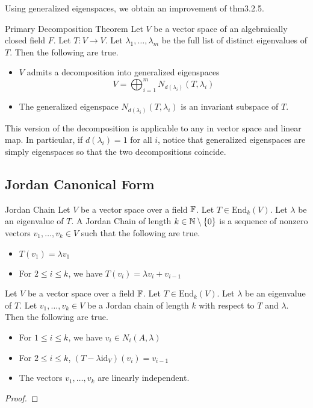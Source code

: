\documentclass[a4paper]{article}
\begin{document}
Using generalized eigenspaces, we obtain an improvement of thm3.2.5. 

\begin{thm}{Primary Decomposition Theorem}{} Let $V$ be a vector space of an algebraically closed field $F$. Let $T:V\to V$. Let $\lambda_1,\dots,\lambda_m$ be the full list of distinct eigenvalues of $T$. Then the following are true. 
\begin{itemize}
\item $V$ admits a decomposition into generalized eigenspaces $$V=\bigoplus_{i=1}^mN_{d(\lambda_i)}(T,\lambda_i)$$
\item The generalized eigenspace $N_{d(\lambda_i)}(T,\lambda_i)$ is an invariant subspace of $T$. 
\end{itemize}
\end{thm}

This version of the decomposition is applicable to any in vector space and linear map. In particular, if $d(\lambda_i)=1$ for all $i$, notice that generalized eigenspaces are simply eigenspaces so that the two decompositions coincide. 

\subsection{Jordan Canonical Form}
\begin{defn}{Jordan Chain}{} Let $V$ be a vector space over a field $\mathbb{F}$. Let $T\in\text{End}_k(V)$. Let $\lambda$ be an eigenvalue of $T$. A Jordan Chain of length $k\in\mathbb{N}\setminus\{0\}$ is a sequence of nonzero vectors $v_1,\dots,v_k\in V$ such that the following are true. 
\begin{itemize}
\item $T(v_1)=\lambda v_1$
\item For $2\leq i\leq k$, we have $T(v_i)=\lambda v_i+v_{i-1}$
\end{itemize}
\end{defn}

\begin{lmm}{}{} Let $V$ be a vector space over a field $\mathbb{F}$. Let $T\in\text{End}_k(V)$. Let $\lambda$ be an eigenvalue of $T$. Let $v_1,\dots,v_k\in V$ be a Jordan chain of length $k$ with respect to $T$ and $\lambda$. Then the following are true. 
\begin{itemize}
\item For $1\leq i\leq k$, we have $v_i\in N_i(A,\lambda)$
\item For $2\leq i\leq k$, $(T-\lambda\text{id}_V)(v_i)=v_{i-1}$
\item The vectors $v_1,\dots,v_k$ are linearly independent. 
\end{itemize} 
\begin{proof}
\end{proof}
\end{lmm}
\end{document}
